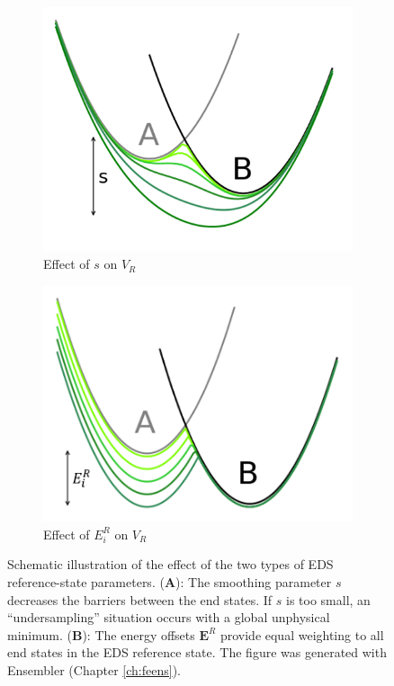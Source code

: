 \begin{figure}[h]
    \begin{center}
    \begin{subfigure}{0.44\columnwidth}
        \centering
        \includegraphics[width=\textwidth]{fig/intro/EDS_parmeters_s.png}
        \caption{Effect of $s$ on $V_R$}
        \label{fig: EDS_potential_behavioura}
    \end{subfigure}
    \begin{subfigure}{0.44\columnwidth}
        \centering
        \includegraphics[width=\textwidth]{fig/intro/EDS_parmeters_Eoff.png}
        \caption{Effect of $E_i^R$ on $V_R$}
        \label{fig: EDS_potential_behaviourb}
    \end{subfigure}
    \end{center}
    \caption{Schematic illustration of the effect of the two types of EDS reference-state parameters. (\textbf{A}): The smoothing parameter $s$ decreases the barriers between the end states. If $s$ is too small, an ``undersampling'' situation occurs with a global unphysical minimum. (\textbf{B}): The energy offsets $\textbf{E}^R$ provide equal weighting to all end states in the EDS reference state.  The figure was generated with Ensembler\cite{Ries2021} (Chapter \ref{ch:feens}).}
    \label{fig: EDS_potential_behaviour}
\end{figure}

